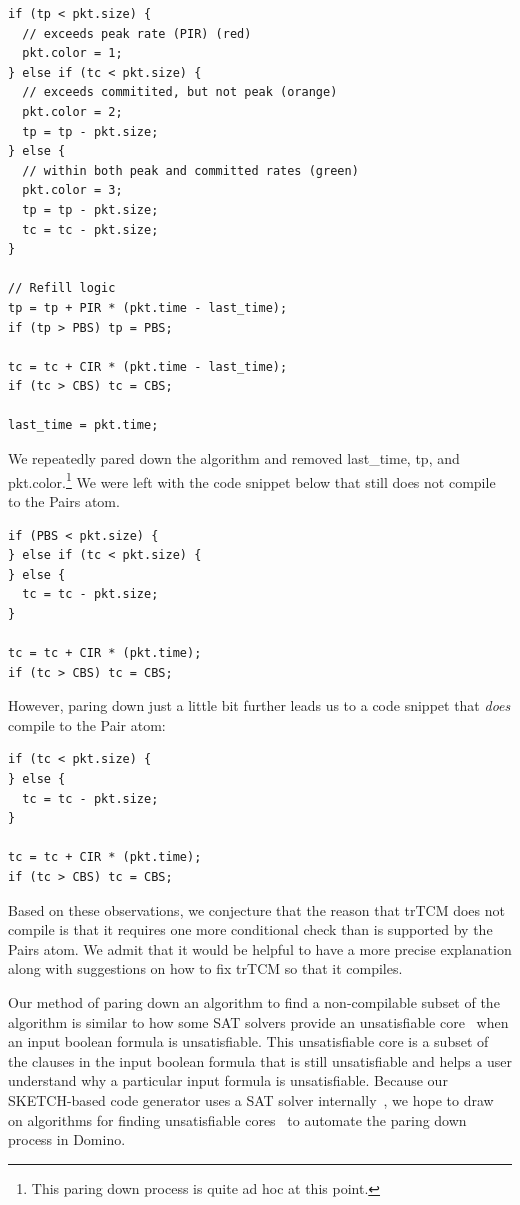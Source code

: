 \begin{verbatim}
if (tp < pkt.size) {
  // exceeds peak rate (PIR) (red)
  pkt.color = 1;
} else if (tc < pkt.size) {
  // exceeds commitited, but not peak (orange)
  pkt.color = 2;
  tp = tp - pkt.size;
} else {
  // within both peak and committed rates (green)
  pkt.color = 3;
  tp = tp - pkt.size;
  tc = tc - pkt.size;
}

// Refill logic
tp = tp + PIR * (pkt.time - last_time);
if (tp > PBS) tp = PBS;

tc = tc + CIR * (pkt.time - last_time);
if (tc > CBS) tc = CBS;

last_time = pkt.time;
\end{verbatim}

We repeatedly pared down the algorithm and removed last\_time, tp, and
pkt.color.\footnote{This paring down process is quite ad hoc at this point.} We
were left with the code snippet below that still does not compile to the Pairs
atom.

\begin{verbatim}
if (PBS < pkt.size) {
} else if (tc < pkt.size) {
} else {
  tc = tc - pkt.size;
}

tc = tc + CIR * (pkt.time);
if (tc > CBS) tc = CBS;
\end{verbatim}

However, paring down just a little bit further leads us to a code snippet that
{\em does} compile to the Pair atom:

\begin{verbatim}
if (tc < pkt.size) {
} else {
  tc = tc - pkt.size;
}

tc = tc + CIR * (pkt.time);
if (tc > CBS) tc = CBS;
\end{verbatim}

Based on these observations, we conjecture that the reason that trTCM does not
compile is that it requires one more conditional check than is supported by the
Pairs atom. We admit that it would be helpful to have a more precise
explanation along with suggestions on how to fix trTCM so that it compiles.

Our method of paring down an algorithm to find a non-compilable subset of the
algorithm is similar to how some SAT solvers provide an unsatisfiable
core~\cite{unsat_core} when an input boolean formula is unsatisfiable. This
unsatisfiable core is a subset of the clauses in the input boolean formula that
is still unsatisfiable and helps a user understand why a particular input
formula is unsatisfiable. Because our SKETCH-based code generator uses a SAT
solver internally~\cite{sketch_asplos}, we hope to draw on algorithms for
finding unsatisfiable cores~\cite{unsat_core} to automate the paring down
process in Domino.


